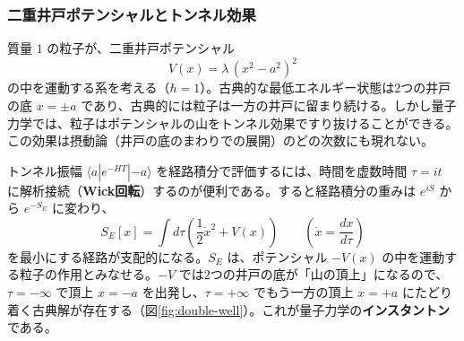 \documentclass[uplatex, dvipdfmx, book]{jsbook}
\let\origsubsubsection\subsubsection
\renewcommand{\subsection}{\origsubsubsection}
\renewcommand{\subsubsection}{\paragraph}
\begin{document}
\subsection{二重井戸ポテンシャルとトンネル効果}

質量 $1$ の粒子が、二重井戸ポテンシャル
\begin{equation}
    V(x) = \lambda\,(x^2 - a^2)^2
\end{equation}
の中を運動する系を考える（$\hbar = 1$）。古典的な最低エネルギー状態は2つの井戸の底 $x = \pm a$ であり、古典的には粒子は一方の井戸に留まり続ける。しかし量子力学では、粒子はポテンシャルの山をトンネル効果ですり抜けることができる。この効果は摂動論（井戸の底のまわりでの展開）のどの次数にも現れない。

トンネル振幅 $\langle a | e^{-HT} | {-a} \rangle$ を経路積分で評価するには、時間を虚数時間 $\tau = it$ に解析接続（\textbf{Wick回転}）するのが便利である。すると経路積分の重みは $e^{iS}$ から $e^{-S_E}$ に変わり、
\begin{equation}
    S_E[x] = \int d\tau \left( \frac{1}{2}\dot{x}^2 + V(x) \right) \qquad \left( \dot{x} = \frac{dx}{d\tau} \right)
\end{equation}
を最小にする経路が支配的になる。$S_E$ は、ポテンシャル $-V(x)$ の中を運動する粒子の作用とみなせる。$-V$ では2つの井戸の底が「山の頂上」になるので、$\tau = -\infty$ で頂上 $x = -a$ を出発し、$\tau = +\infty$ でもう一方の頂上 $x = +a$ にたどり着く古典解が存在する（図\ref{fig:double-well}）。これが量子力学の\textbf{インスタントン}である。
\end{document}
